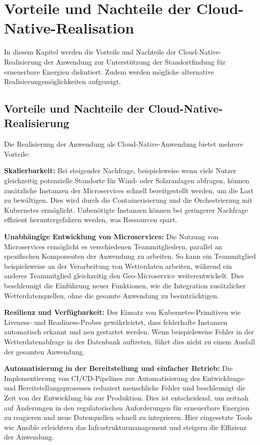 \chapter{Vorteile und Nachteile der Cloud-Native-Realisation}

In diesem Kapitel werden die Vorteile und Nachteile der Cloud-Native-Realisierung der Anwendung zur Unterstützung der Standortfindung für erneuerbare Energien diskutiert. Zudem werden mögliche alternative Realisierungsmöglichkeiten aufgezeigt.

\section{Vorteile und Nachteile der Cloud-Native-Realisierung}

Die Realisierung der Anwendung als Cloud-Native-Anwendung bietet mehrere Vorteile:

\textbf{Skalierbarkeit:} Bei steigender Nachfrage, beispielsweise wenn viele Nutzer gleichzeitig potenzielle Standorte für Wind- oder Solaranlagen abfragen, können zusätzliche Instanzen der Microservices schnell bereitgestellt werden, um die Last zu bewältigen. Dies wird durch die Containerisierung und die Orchestrierung mit Kubernetes ermöglicht. Unbenötigte Instanzen können bei geringerer Nachfrage effizient heruntergefahren werden, was Ressourcen spart.

\textbf{Unabhängige Entwicklung von Microservices:} Die Nutzung von Microservices ermöglicht es verschiedenen Teammitgliedern, parallel an spezifischen Komponenten der Anwendung zu arbeiten. So kann ein Teammitglied beispielsweise an der Verarbeitung von Wetterdaten arbeiten, während ein anderes Teammitglied gleichzeitig den Geo-Microservice weiterentwickelt. Dies beschleunigt die Einführung neuer Funktionen, wie die Integration zusätzlicher Wetterdatenquellen, ohne die gesamte Anwendung zu beeinträchtigen.

\textbf{Resilienz und Verfügbarkeit:} Der Einsatz von Kubernetes-Primitiven wie Liveness- und Readiness-Probes gewährleistet, dass fehlerhafte Instanzen automatisch erkannt und neu gestartet werden. Wenn beispielsweise Fehler in der Wetterdatenabfrage in der Datenbank auftreten, führt dies nicht zu einem Ausfall der gesamten Anwendung.

\textbf{Automatisierung in der Bereitstellung und einfacher Betrieb:} Die Implementierung von CI/CD-Pipelines zur Automatisierung des Entwicklungs- und Bereitstellungsprozesses reduziert menschliche Fehler und beschleunigt die Zeit von der Entwicklung bis zur Produktion. Dies ist entscheidend, um zeitnah auf Änderungen in den regulatorischen Anforderungen für erneuerbare Energien zu reagieren und neue Datenquellen schnell zu integrieren. Hier eingesetzte Tools wie Ansible erleichtern das Infrastrukturmanagement und steigern die Effizienz der Anwendung.

